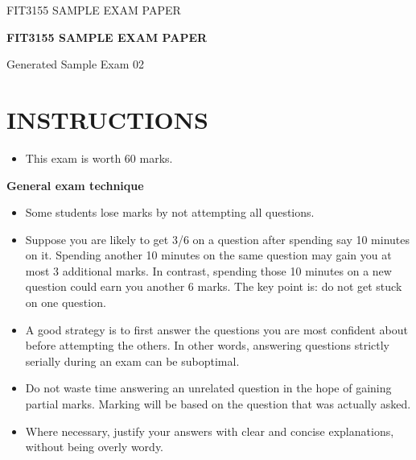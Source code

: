 \documentclass[12pt,letterpaper]{article}
\begin{document}
\begin{titlepage}
  \thispagestyle{empty}
  \vspace*{0.18\textheight}
  {\Large FIT3155 \hfill SAMPLE EXAM PAPER\par}
  \vspace{2.2cm}
  \begin{center}
    {\LARGE\bfseries FIT3155 SAMPLE EXAM PAPER\par}
    \vspace{0.8cm}
    {\large Generated Sample Exam 02\par}
  \end{center}
\end{titlepage}

\setcounter{page}{2}

\section*{INSTRUCTIONS}

\begin{itemize}
  \item This exam is worth 60 marks.
\end{itemize}

\begin{center}
  \textbf{General exam technique}
\end{center}

\begin{itemize}
  \item Some students lose marks by not attempting all questions.

  \item Suppose you are likely to get 3/6 on a question after spending say 10 minutes on it.
  Spending another 10 minutes on the same question may gain you at most 3 additional
  marks. In contrast, spending those 10 minutes on a new question could earn you another
  6 marks. The key point is: do not get stuck on one question.

  \item A good strategy is to first answer the questions you are most confident about before
  attempting the others. In other words, answering questions strictly serially during an
  exam can be suboptimal.

  \item Do not waste time answering an unrelated question in the hope of gaining partial marks.
  Marking will be based on the question that was actually asked.

  \item Where necessary, justify your answers with clear and concise explanations, without being
  overly wordy.
\end{itemize}
\end{document}
